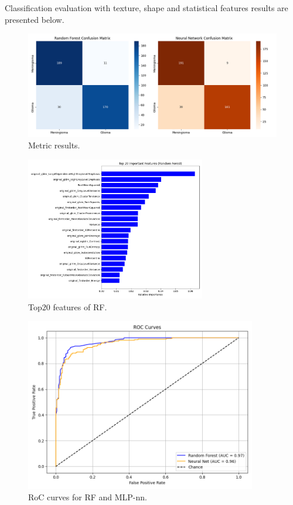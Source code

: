 \documentclass[11pt,a4paper]{article}
\begin{document}
		Classification evaluation with texture, shape and statistical features results are presented below.
	
		\begin{figure}[h]
			\centering
			\includegraphics[width=1.1\textwidth]{images/classification_pyradiomics.png}
			\caption{Metric results.}
			\label{fig1:}
		\end{figure}		

		\begin{figure}[h]
			\centering
			\includegraphics[width=0.7\textwidth]{images/top20_rf_pyradiomics.png}
			\caption{Top20 features of RF.}
			\label{fig1:}
		\end{figure}		

		\begin{figure}[H]
			\centering
			\includegraphics[width=0.9\textwidth]{images/roc_pyradiomics.png}
			\caption{RoC curves for RF and MLP-nn.}
			\label{fig1:}
		\end{figure}		
\end{document}
